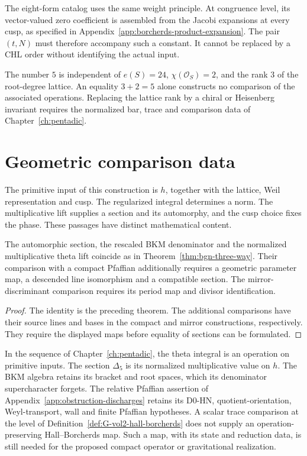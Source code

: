 The eight-form catalog uses the same weight principle.
At congruence level, its vector-valued zero coefficient is assembled
from the Jacobi expansions at every cusp, as specified in
Appendix~\ref{app:borcherds-product-expansion}.
The pair \((t,N)\) must therefore accompany such a constant.
It cannot be replaced by a CHL order without identifying the actual
input.

The number \(5\) is independent of
\(e(S)=24\), \(\chi(\mathcal O_S)=2\), and the rank \(3\)
of the root-degree lattice.
An equality \(3+2=5\) alone constructs no comparison of the
associated operations.
Replacing the lattice rank by a chiral or Heisenberg invariant
requires the normalized bar, trace and comparison data of
Chapter~\ref{ch:pentadic}.

\section{Geometric comparison data}
\label{ssec:beilinson-cut-view-v}
\label{ssec:theta-lift-boundary}

The primitive input of this construction is \(h\), together with the
lattice, Weil representation and cusp.
The regularized integral determines a norm.
The multiplicative lift supplies a section and its automorphy,
and the cusp choice fixes the phase.
These passages have distinct mathematical content.

\begin{corollary}
\label{cor:five-views-coincidence}
The automorphic section, the rescaled BKM denominator and the
normalized multiplicative theta lift coincide as in
Theorem~\ref{thm:bgn-three-way}.
Their comparison with a compact Pfaffian additionally requires a
geometric parameter map, a descended line isomorphism and a
compatible section.  The mirror-discriminant comparison requires
its period map and divisor identification.
\end{corollary}

\begin{proof}
The identity is the preceding theorem.
The additional comparisons have their source lines and bases in
the compact and mirror constructions, respectively.
They require the displayed maps before equality of sections can
be formulated.
\end{proof}

In the sequence of Chapter~\ref{ch:pentadic}, the theta integral
is an operation on primitive inputs.
The section \(\Delta_5\) is its normalized multiplicative value
on \(h\).
The BKM algebra retains its bracket and root spaces, which its
denominator supercharacter forgets.
The relative Pfaffian assertion of
Appendix~\ref{app:obstruction-discharges} retains its D0-HN,
quotient-orientation, Weyl-transport, wall and finite Pfaffian
hypotheses.  A scalar trace comparison at the level of
Definition~\ref{def:G-vol2-hall-borcherds} does not supply an
operation-preserving Hall--Borcherds map.
Such a map, with its state and reduction data, is still needed for
the proposed compact operator or gravitational realization.


